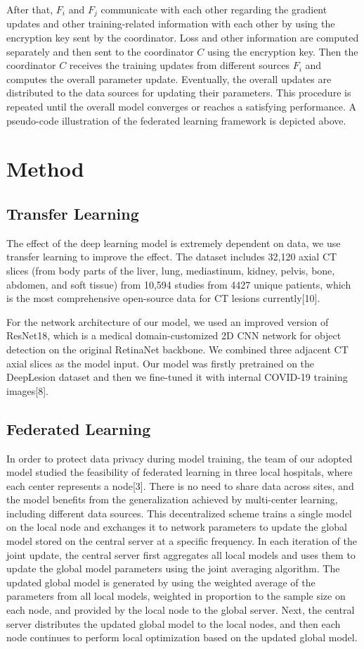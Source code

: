 \documentclass[12pt]{spie}
\begin{document}
After that, $F_{i}$ and $F_{j}$ communicate with each other regarding the gradient updates and other training-related information with each other by using the encryption key sent by the coordinator.
Loss and other information are computed separately and then sent to the coordinator $C$ using the encryption key.
Then the coordinator $C$ receives the training updates from different sources $F_{i}$ and computes the overall parameter update.
Eventually, the overall updates are distributed to the data sources for updating their parameters.
This procedure is repeated until the overall model converges or reaches a satisfying performance. A pseudo-code illustration of the federated learning framework is depicted above.

\section{Method}
\subsection{Transfer Learning}
The effect of the deep learning model is extremely dependent on data, we use transfer learning to improve the effect. The dataset includes 32,120 axial CT slices (from body parts of the liver, lung, mediastinum, kidney, pelvis, bone, abdomen, and soft tissue) from 10,594 studies from 4427 unique patients, which is the most comprehensive open-source data for CT lesions currently[10]. 

For the network architecture of our model, we used an improved version of ResNet18, which is a medical domain-customized 2D CNN network for object detection on the original RetinaNet backbone. We combined three adjacent CT axial slices as the model input. Our model was firstly pretrained on the DeepLesion dataset and then we fine-tuned it with internal COVID-19 training images[8].

\subsection{Federated Learning}
In order to protect data privacy during model training, the team of our adopted model studied the feasibility of federated learning in three local hospitals, where each center represents a node[3]. There is no need to share data across sites, and the model benefits from the generalization achieved by multi-center learning, including different data sources. This decentralized scheme trains a single model on the local node and exchanges it to network parameters to update the global model stored on the central server at a specific frequency. In each iteration of the joint update, the central server first aggregates all local models and uses them to update the global model parameters using the joint averaging algorithm. The updated global model is generated by using the weighted average of the parameters from all local models, weighted in proportion to the sample size on each node, and provided by the local node to the global server. Next, the central server distributes the updated global model to the local nodes, and then each node continues to perform local optimization based on the updated global model.
\end{document}
